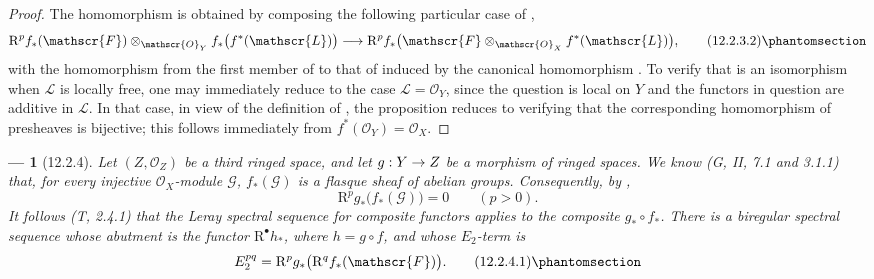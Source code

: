\documentclass[oneside]{amsart}
\theoremstyle{ega-env-style}
\newtheorem*{env}{---}
\theoremstyle{ega-thm-env-style}
\theoremstyle{ega-defn-env-style}
\def\mathcal{\mathscr}
\def\sh{\mathcal}                   %
\def\RR{\mathrm{R}}                 %
\renewcommand{\to}{\mathchoice{\longrightarrow}{\rightarrow}{\rightarrow}{\rightarrow}}
\let\EGAOriginalLabel\label
\renewcommand{\label}[1]{\phantomsection\EGAOriginalLabel{#1}}
\begin{document}
\begin{proof}
The homomorphism  is obtained by composing the
following particular case of ,
\[
  \RR^p f_*(\sh{F})
    \otimes_{\sh{O}_Y}f_*\bigl(f^*(\sh{L})\bigr)
  \longrightarrow
  \RR^p f_*
    \bigl(\sh{F}\otimes_{\sh{O}_X}f^*(\sh{L})\bigr),
  \tag{12.2.3.2}
  \label{0.12.2.3.2}
\]
with the homomorphism from the first member of
 to that of  induced by the
canonical homomorphism .
To verify that  is an isomorphism when $\sh{L}$ is
locally free, one may immediately reduce to the case
$\sh{L}=\sh{O}_Y$, since the question is local on $Y$ and the
functors in question are additive in $\sh{L}$.
In that case, in view of the definition of , the
proposition reduces to verifying that the corresponding homomorphism
of presheaves is bijective; this follows immediately from
$f^*(\sh{O}_Y)=\sh{O}_X$.
\end{proof}

\begin{env}[12.2.4]
\label{0.12.2.4}
Let $(Z,\sh{O}_Z)$ be a third ringed space, and let
$g:Y\to Z$ be a morphism of ringed spaces.
We know (G, II, 7.1 and 3.1.1) that, for every injective
$\sh{O}_X$-module $\sh{G}$, $f_*(\sh{G})$ is a flasque sheaf of
abelian groups.  Consequently, by ,
\[
  \RR^p g_*\bigl(f_*(\sh{G})\bigr)=0
  \qquad(p>0).
\]
It follows (T, 2.4.1) that the Leray spectral sequence for composite
functors applies to the composite $g_*\circ f_*$.  There is a
biregular spectral sequence whose abutment is the functor
$\RR^\bullet h_*$, where $h=g\circ f$, and whose $E_2$-term is
\[
  E_2^{pq}=\RR^p g_*\bigl(\RR^q f_*(\sh{F})\bigr).
  \tag{12.2.4.1}
  \label{0.12.2.4.1}
\]
\end{env}
\end{document}
